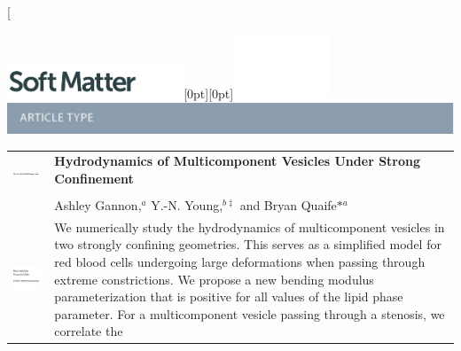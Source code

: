 \documentclass[twoside,twocolumn,9pt]{article}
\begin{document}
\twocolumn[
  \begin{@twocolumnfalse}
{\includegraphics[height=30pt]{head_foot/SM}\hfill\raisebox{0pt}[0pt][0pt]{\includegraphics[height=55pt]{head_foot/RSC_LOGO_CMYK}}\\[1ex]
\includegraphics[width=18.5cm]{head_foot/header_bar}}\par
\vspace{1em}
\sffamily
\begin{tabular}{m{4.5cm} p{13.5cm} }
%
\includegraphics{head_foot/DOI} & \noindent\LARGE{\textbf{Hydrodynamics of Multicomponent Vesicles Under Strong Confinement}} \\
\vspace{0.3cm} & \vspace{0.3cm} \\
%
 & \noindent\large{Ashley Gannon,\textit{$^{a}$} Y.-N. Young,\textit{$^{b\ddag}$} and Bryan Quaife\textit{${\ast}${$^{a}$}}} \\
%
\includegraphics{head_foot/dates} & \noindent\normalsize{We numerically
  study the hydrodynamics of multicomponent vesicles in two strongly
  confining geometries. This serves as a simplified model for red blood
  cells undergoing large deformations when passing through extreme
  constrictions. We propose a new bending modulus parameterization that
  is positive for all values of the lipid phase parameter. For a
  multicomponent vesicle passing through a stenosis, we correlate the
}
\end{tabular}
\end{@twocolumnfalse}
\end{document}
